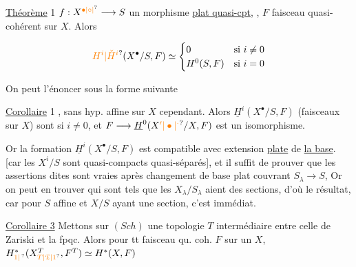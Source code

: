 

\uline{Théorème} 1 \quad $f:X^{\unsure{\bullet|\circ|{}}}\longrightarrow S$ un morphisme \uline{ plat quasi-cpt},  , $F$ faisceau quasi-cohérent sur $X$. Alors

\[
\unsure{H^i|\check H^i}(X^{\bullet}/S,F)\simeq
\begin{cases}0&\text{si }i\ne0\\ H^0(S,F)&\text{si }i=0\end{cases}
\]

On peut l'énoncer sous la forme suivante

\uline{Corollaire} 1 \quad {} , sans hyp. affine sur $X$ cependant. Alors $\underline H^i(X^{\bullet}/S,F)$ (faisceaux  sur $X$)   sont  si $i\ne0$, et $F\longrightarrow\underline H^0(X\unsure{'|\bullet|^{\cdot}}/X,F)$ est un isomorphisme.

Or la formation  $\underline H^i(X^{\bullet}/S,F)$ est compatible avec extension \uline{plate} de \uline{la base}. [car les $X^{i}/S$ sont quasi-compacts quasi-séparés], et il suffit de prouver que les assertions dites sont vraies après changement de base plat couvrant $S_\lambda\longrightarrow S$,  Or on peut en trouver qui sont tels que les $X_\lambda/S_\lambda$ aient des sections, d'où le résultat, car pour $S$ affine et $X/S$ ayant une section, c'est immédiat.


\uline{Corollaire 3} Mettons sur $(Sch)$ une topologie $T$ intermédiaire entre celle de Zariski et la fpqc. Alors pour tt faisceau qu. coh. $F$ sur un $X$, $H^*_{\unsure{1|\,}}(X^T_{\unsure{T|\mathfrak{T}|1}},F^T)\simeq H^*(X,F)$

